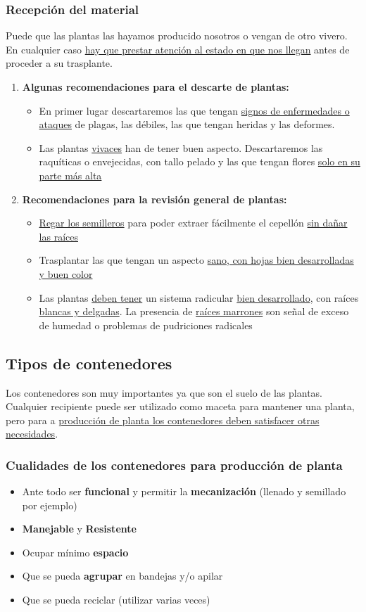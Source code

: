 \documentclass[a4paper,12pt,oneside]{article}
\begin{document}
\subsubsection{Recepción del material}
\label{sec:org98148f3}
Puede que las plantas las hayamos producido nosotros o vengan de otro
vivero. En cualquier caso \uline{hay que prestar atención al estado en que nos
llegan} antes de proceder a su trasplante.
\begin{enumerate}
\item \textbf{Algunas recomendaciones para el descarte de plantas:}
\begin{itemize}
\item En primer lugar descartaremos las que tengan \uline{signos de enfermedades o ataques}
de plagas, las débiles, las que tengan heridas y las deformes.
\item Las plantas \uline{vivaces} han de tener buen aspecto. Descartaremos las raquíticas
o envejecidas, con tallo pelado y las que tengan flores \uline{solo en su parte más
alta}
\end{itemize}
\item \textbf{Recomendaciones para la revisión general de plantas:}
\begin{itemize}
\item \uline{Regar los semilleros} para poder extraer fácilmente el cepellón \uline{sin dañar
las raíces}
\item Trasplantar las que tengan un aspecto \uline{sano, con hojas bien desarrolladas
y buen color}
\item Las plantas \uline{deben tener} un sistema radicular \uline{bien desarrollado}, con
raíces \uline{blancas y delgadas}. La presencia de \uline{raíces marrones} son señal de
exceso de humedad o problemas de pudriciones radicales
\end{itemize}
\end{enumerate}
\subsection{Tipos de contenedores}
\label{sec:orgd66f11c}
Los contenedores son muy importantes ya que son el suelo de las
plantas. Cualquier recipiente puede ser utilizado como maceta para mantener una
planta, pero para a \uline{producción de planta los contenedores deben satisfacer
otras necesidades}.
\subsubsection{Cualidades de los contenedores para producción de planta}
\label{sec:org7eaead9}
\begin{itemize}
\item Ante todo ser \textbf{funcional} y permitir la \textbf{mecanización} (llenado y semillado
por ejemplo)
\item \textbf{Manejable} y \textbf{Resistente}
\item Ocupar mínimo \textbf{espacio}
\item Que se pueda \textbf{agrupar} en bandejas y/o apilar
\item Que se pueda reciclar (utilizar varias veces)
\end{itemize}
\end{document}

